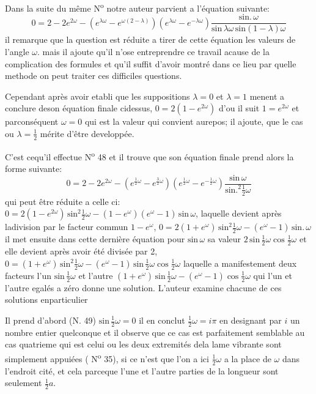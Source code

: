 \documentclass[11pt,a4paper]{article}
\begin{document}
Dans la suite du même N\textsuperscript{o} notre auteur parvient a l'équation suivante:
\[ 0=2-2e^{2\omega}-(e^{\lambda\omega}-e^{\omega(2-\lambda)})(e^{\lambda\omega}-e^{-\lambda\omega})\frac{\text{sin.}\,\omega}{\text{sin}\,\lambda\omega\,\text{sin}(1-\lambda)\omega} \]
il remarque que la question est réduite a tirer de cette équation les valeurs de
l'angle $\omega$. mais il ajoute qu'il n'ose entreprendre ce travail acause de la
complication des formules et qu'il suffit d'avoir montré dans ce lieu par quelle
methode on peut traiter ces difficiles questions.

Cependant après avoir etabli que les suppositions $\lambda=0$ et $\lambda=1$ menent
a conclure deson équation finale cidessus, $0=2(1-e^{2\omega})$ d'ou il suit $1=e^{2\omega}$
et parconséquent $\omega=0$ qui est la valeur qui convient aurepos; il ajoute, que
le cas ou $\lambda=\frac{1}{2}$ mérite d'être developpée.

C'est cequ'il effectue N\textsuperscript{o} 48 et il trouve que son équation finale prend
alors la forme suivante:
\[ 0=2-2e^{2\omega}-(e^{\frac{1}{2}\omega}-e^{\frac{3}{2}\omega})(e^{\frac{1}{2}\omega}-e^{-\frac{1}{2}\omega})\frac{\text{sin}\,\omega}{\text{sin.}^2\frac{1}{2}\omega} \]
qui peut être réduite a celle ci: $0=2(1-e^{2\omega})\,\text{sin}^2\frac{1}{2}\omega-(1-e^{\omega})(e^{\omega}-1)\,\text{sin}\,\omega$,
laquelle devient après ladivision par le facteur commun $1-e^{\omega}$,
$0=2(1+e^{\omega})\,\text{sin}^2\frac{1}{2}\omega-(e^{\omega}-1)\,\text{sin.}\,\omega$ il met ensuite dans cette dernière
équation pour $\text{sin}\,\omega$ sa valeur $2\,\text{sin}\,\frac{1}{2}\omega\cos\frac{1}{2}\omega$ et elle devient après avoir
été divisée par 2, $0=(1+e^{\omega})\,\text{sin}^2\frac{1}{2}\omega-(e^{\omega}-1)\,\text{sin}\,\frac{1}{2}\omega\cos\frac{1}{2}\omega$
laquelle a manifestement deux facteurs l'un $\text{sin}\,\frac{1}{2}\omega$ et l'autre
$(1+e^{\omega})\,\text{sin}\,\frac{1}{2}\omega-(e^{\omega}-1)\cos\frac{1}{2}\omega$ qui l'un et l'autre egalés a zéro donne
une solution. L'auteur examine chacune de ces solutions enparticulier

Il prend d'abord (N. 49) $\text{sin}\,\frac{1}{2}\omega=0$ il en conclut $\frac{1}{2}\omega=i\pi$ en designant par
$i$ un nombre entier quelconque et il observe que ce cas est parfaitement semblable
au cas quatrieme qui est celui ou les deux extremités dela lame vibrante sont
simplement appuiées ( N\textsuperscript{o} 35), si ce n'est que l'on a ici $\frac{1}{2}\omega$ a la place
de $\omega$ dans l'endroit cité, et cela parceque l'une et l'autre parties de la longueur
sont seulement $\frac{1}{2}a$.
\end{document}
